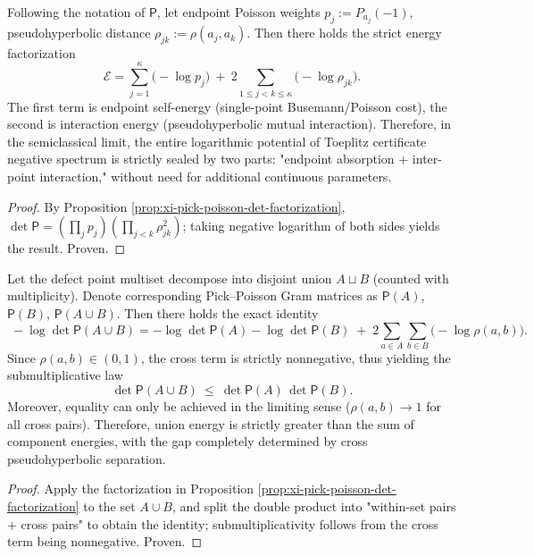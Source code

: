 \begin{corollary}\label{cor:xi-pick-poisson-energy-coulomb-decomposition}
Following the notation of \(\mathsf P\), let endpoint Poisson weights \(p_j:=P_{a_j}(-1)\), pseudohyperbolic distance \(\rho_{jk}:=\rho(a_j,a_k)\).
Then there holds the strict energy factorization
\[
\boxed{\;
\mathcal{E}
=\sum_{j=1}^{\kappa}\bigl(-\log p_j\bigr)\ +\ 2\sum_{1\le j<k\le\kappa}\bigl(-\log\rho_{jk}\bigr).\;}
\]
The first term is endpoint self-energy (single-point Busemann/Poisson cost), the second is interaction energy (pseudohyperbolic mutual interaction).
Therefore, in the semiclassical limit, the entire logarithmic potential of Toeplitz certificate negative spectrum is strictly sealed by two parts: "endpoint absorption + inter-point interaction," without need for additional continuous parameters.
\end{corollary}
\begin{proof}
By Proposition \ref{prop:xi-pick-poisson-det-factorization},
\(
\det\mathsf P=(\prod_j p_j)(\prod_{j<k}\rho_{jk}^2)
\);
taking negative logarithm of both sides yields the result. Proven.
\end{proof}

\begin{proposition}\label{prop:xi-pick-poisson-union-submultiplicativity-cross-energy}
Let the defect point multiset decompose into disjoint union \(A\sqcup B\) (counted with multiplicity).
Denote corresponding Pick--Poisson Gram matrices as \(\mathsf P(A)\), \(\mathsf P(B)\), \(\mathsf P(A\cup B)\).
Then there holds the exact identity
\[
\boxed{\;
-\log\det\mathsf P(A\cup B)
=-\log\det\mathsf P(A)-\log\det\mathsf P(B)
\;+\;2\sum_{a\in A}\sum_{b\in B}\bigl(-\log\rho(a,b)\bigr).\;}
\]
Since \(\rho(a,b)\in(0,1)\), the cross term is strictly nonnegative, thus yielding the submultiplicative law
\[
\boxed{\;
\det\mathsf P(A\cup B)\ \le\ \det\mathsf P(A)\,\det\mathsf P(B).\;}
\]
Moreover, equality can only be achieved in the limiting sense (\(\rho(a,b)\to 1\) for all cross pairs).
Therefore, union energy is strictly greater than the sum of component energies, with the gap completely determined by cross pseudohyperbolic separation.
\end{proposition}
\begin{proof}
Apply the factorization in Proposition \ref{prop:xi-pick-poisson-det-factorization} to the set \(A\cup B\), and split the double product into "within-set pairs + cross pairs" to obtain the identity;
submultiplicativity follows from the cross term being nonnegative. Proven.
\end{proof}

